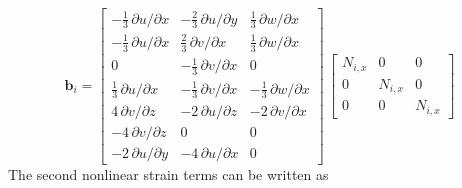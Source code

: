 \begin{equation}
\mathbf{b}_i = \begin{bmatrix}

-\tfrac{1}{3} \, \partial u / \partial x &  - \tfrac{2}{3} \, \partial u / \partial y & \tfrac{1}{3} \, \partial w / \partial x  \\
-\tfrac{1}{3} \, \partial u / \partial x &  \tfrac{2}{3} \, \partial v / \partial x & \tfrac{1}{3} \, \partial w / \partial x  \\
0  & -\tfrac{1}{3} \, \partial v / \partial x & 0 \\
\tfrac{1}{3} \, \partial u / \partial x &  - \tfrac{1}{3} \, \partial v / \partial x & - \tfrac{1}{3} \, \partial w / \partial x  \\
4 \, \partial v / \partial z &  - 2 \, \partial u / \partial z & - 2 \,  \partial v / \partial x  \\
- 4 \, \partial v / \partial z &  0 & 0  \\
- 2 \, \partial u / \partial y &   - 4 \, \partial u / \partial x & 0   \end{bmatrix}  \, \begin{bmatrix}
N_{i,x} &  0 & 0  \\
0 & N_{i,x} & 0  \\
0 & 0 & N_{i,x} \end{bmatrix} 
\end{equation}
The second nonlinear strain terms can be written as 
